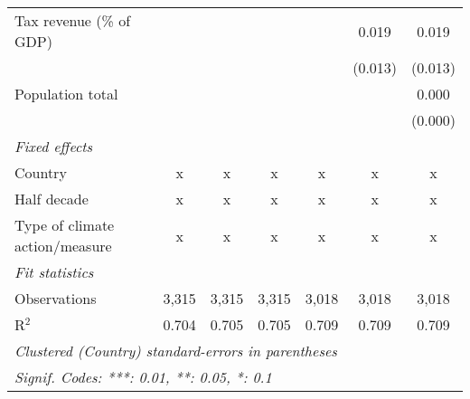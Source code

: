\begin{tabular}{lcccccc}
   Tax revenue (\% of GDP)                                &              &               &               &                & 0.019          & 0.019\\   
                                                          &              &               &               &                & (0.013)        & (0.013)\\   
   Population total                                       &              &               &               &                &                & 0.000\\   
                                                          &              &               &               &                &                & (0.000)\\   
   \emph{Fixed effects}\\
   Country                                                & x            & x             & x             & x              & x              & x\\  
   Half decade                                            & x            & x             & x             & x              & x              & x\\  
   Type of climate action/measure                         & x            & x             & x             & x              & x              & x\\  
   \midrule \emph{Fit statistics}\\
   Observations                                           & 3,315        & 3,315         & 3,315         & 3,018          & 3,018          & 3,018\\  
   R$^2$                                                  & 0.704        & 0.705         & 0.705         & 0.709          & 0.709          & 0.709\\  
   \midrule
   \multicolumn{7}{l}{\emph{Clustered (Country) standard-errors in parentheses}}\\
   \multicolumn{7}{l}{\emph{Signif. Codes: ***: 0.01, **: 0.05, *: 0.1}}\\
\end{tabular}
\par\endgroup



